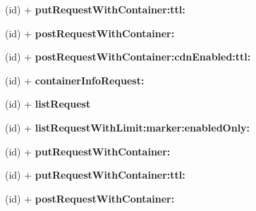 \begin{DoxyCompactItemize}
\item 
\hypertarget{interface_a_s_i_cloud_files_c_d_n_request_ab7db6c10a48bfb16bdae65e5d7740148}{
(id) + {\bfseries put\-Request\-With\-Container\-:ttl\-:}}
\label{interface_a_s_i_cloud_files_c_d_n_request_ab7db6c10a48bfb16bdae65e5d7740148}

\item 
\hypertarget{interface_a_s_i_cloud_files_c_d_n_request_aa201c29194b1b8465c6b45a582904573}{
(id) + {\bfseries post\-Request\-With\-Container\-:}}
\label{interface_a_s_i_cloud_files_c_d_n_request_aa201c29194b1b8465c6b45a582904573}

\item 
\hypertarget{interface_a_s_i_cloud_files_c_d_n_request_adc0b232663fe13af064f00522d6da305}{
(id) + {\bfseries post\-Request\-With\-Container\-:cdn\-Enabled\-:ttl\-:}}
\label{interface_a_s_i_cloud_files_c_d_n_request_adc0b232663fe13af064f00522d6da305}

\item 
\hypertarget{interface_a_s_i_cloud_files_c_d_n_request_a7530647efafef518b550f6390b6b4c30}{
(id) + {\bfseries container\-Info\-Request\-:}}
\label{interface_a_s_i_cloud_files_c_d_n_request_a7530647efafef518b550f6390b6b4c30}

\item 
\hypertarget{interface_a_s_i_cloud_files_c_d_n_request_a9d7f472b708be8a5bbff26ecf72ca0e7}{
(id) + {\bfseries list\-Request}}
\label{interface_a_s_i_cloud_files_c_d_n_request_a9d7f472b708be8a5bbff26ecf72ca0e7}

\item 
\hypertarget{interface_a_s_i_cloud_files_c_d_n_request_a3acbf036c7e416c2b6f66ac6be6a9617}{
(id) + {\bfseries list\-Request\-With\-Limit\-:marker\-:enabled\-Only\-:}}
\label{interface_a_s_i_cloud_files_c_d_n_request_a3acbf036c7e416c2b6f66ac6be6a9617}

\item 
\hypertarget{interface_a_s_i_cloud_files_c_d_n_request_a92d1b9ce687974a8ffab0b026a39eb28}{
(id) + {\bfseries put\-Request\-With\-Container\-:}}
\label{interface_a_s_i_cloud_files_c_d_n_request_a92d1b9ce687974a8ffab0b026a39eb28}

\item 
\hypertarget{interface_a_s_i_cloud_files_c_d_n_request_ab7db6c10a48bfb16bdae65e5d7740148}{
(id) + {\bfseries put\-Request\-With\-Container\-:ttl\-:}}
\label{interface_a_s_i_cloud_files_c_d_n_request_ab7db6c10a48bfb16bdae65e5d7740148}

\item 
\hypertarget{interface_a_s_i_cloud_files_c_d_n_request_aa201c29194b1b8465c6b45a582904573}{
(id) + {\bfseries post\-Request\-With\-Container\-:}}
\label{interface_a_s_i_cloud_files_c_d_n_request_aa201c29194b1b8465c6b45a582904573}


\end{DoxyCompactItemize}

